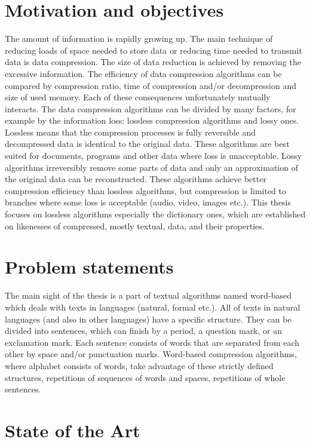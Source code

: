 \begin{introduction}
	\section{Motivation and objectives}

	The amount of information is rapidly growing up. The main technique of reducing loads of space needed to store data or reducing time needed to transmit data is data compression. The size of data reduction is achieved by removing the excessive information.
	The efficiency of data compression algorithms can be compared by compression ratio, time of compression and/or decompression and size of used memory. Each of these consequences unfortunately mutually interacts.
	The data compression algorithms can be divided by many factors, for example by the information loss: lossless compression algorithms and lossy ones. Lossless means that the compression processes is fully reversible and decompressed data is identical to the original data. These algorithms are best suited for documents, programs and other data where loss is unacceptable. Lossy algorithms irreversibly remove some parts of data and only an approximation of the original data can be reconstructed. These algorithms achieve better compression efficiency than lossless algorithms, but compression is limited to branches where some loss is acceptable (audio, video, images etc.).
	This thesis focuses on lossless algorithms especially the dictionary ones, which are established on likenesses of compressed, mostly textual, data, and their properties.

	\section{Problem statements}

	The main sight of the thesis is a part of textual algorithms named word-based which deals with texts in languages (natural, formal etc.). All of texts in natural languages (and also in other languages) have a specific structure. They can be divided into sentences, which can finish by a period, a question mark, or an exclamation mark. Each sentence consists of words that are separated from each other by space and/or punctuation marks.
	Word-based compression algorithms, where alphabet consists of words, take advantage of these strictly defined structures, repetitions of sequences of words and spaces, repetitions of whole sentences.
	\section{State of the Art}


\end{introduction}
